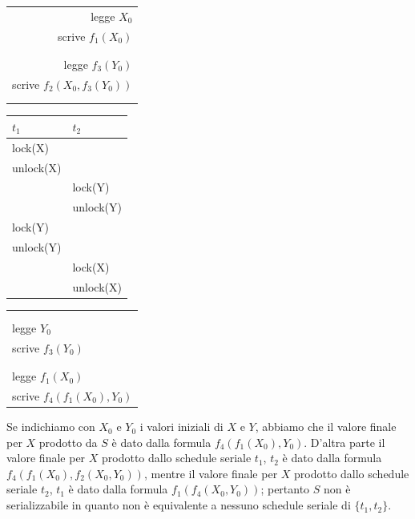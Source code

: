 \begin{center}
\begin{multicols}{3}
 \begin{flushright}
\begin{tabular}{r}
   \\
   legge $X_0$\\
   scrive $f_1(X_0)$\\
   \\
   \\
   legge $f_3(Y_0)$\\
   scrive $f_2(X_0, f_3(Y_0))$\\ 
   \\
   \\
  \end{tabular}
  \end{flushright}
 \begin{tabular}{|l|l|}
 \hline
 $t_1$ & $t_2$\\
 \hline
   lock(X)&\\
   unlock(X)&\\
   &lock(Y)\\
   &unlock(Y)\\
   lock(Y)&\\ 
   unlock(Y)&\\
   &lock(X)\\
   &unlock(X)\\
   \hline
  \end{tabular}
  \begin{flushleft}
  \begin{tabular}{l}
   \\
   \\
   \\
   legge $Y_0$\\
   scrive $f_3(Y_0)$\\
    \\
   \\
   legge $f_1(X_0)$\\
   scrive $f_4(f_1(X_0),Y_0)$\\ 

  \end{tabular}
  \end{flushleft}
  
\end{multicols}
\end{center}
Se indichiamo con $X_0$ e $Y_0$ i valori iniziali di $X$ e $Y$, abbiamo che il valore finale per $X$ prodotto da $S$
è dato dalla formula $f_4(f_1(X_0), Y_0)$. D'altra parte il valore finale per $X$ prodotto dallo schedule
seriale $t_1$, $t_2$ è dato dalla formula $f_4(f_1(X_0), f_2(X_0, Y_0))$, mentre il valore finale per $X$ prodotto dallo
schedule seriale $t_2$, $t_1$ è dato dalla formula $f_1(f_4(X_0, Y_0))$; pertanto $S$ non è serializzabile in quanto
non è equivalente a nessuno schedule seriale di $\{t_1, t_2\}$.\\

